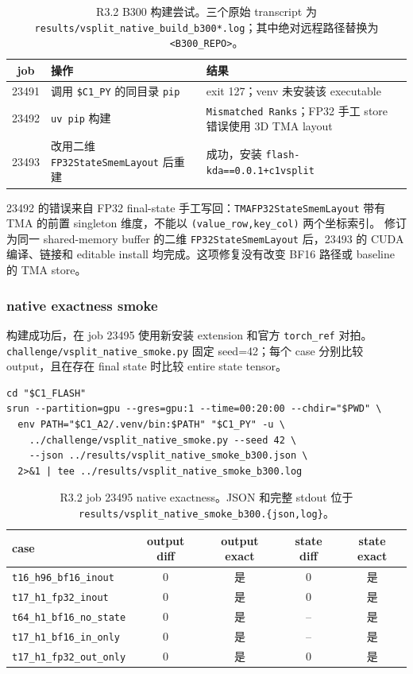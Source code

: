 \documentclass[11pt,a4paper,fontset=none]{ctexart}
\newcommand{\code}[1]{\texttt{#1}}
\begin{document}
\begin{table}[htbp]
\centering
\small
\begin{tabular}{c l l}
\toprule
job & 操作 & 结果 \\
\midrule
23491 & 调用 \code{\$C1\_PY} 的同目录 \code{pip} & exit 127；venv 未安装该 executable \\
23492 & \code{uv pip} 构建 & \code{Mismatched Ranks}；FP32 手工 store 错误使用 3D TMA layout \\
23493 & 改用二维 \code{FP32StateSmemLayout} 后重建 & 成功，安装 \code{flash-kda==0.0.1+c1vsplit} \\
\bottomrule
\end{tabular}
\caption{R3.2 B300 构建尝试。三个原始 transcript 为
\code{results/vsplit\_native\_build\_b300*.log}；其中绝对远程路径替换为
\code{<B300\_REPO>}。}
\end{table}

23492 的错误来自 FP32 final-state 手工写回：\code{TMAFP32StateSmemLayout} 带有
TMA 的前置 singleton 维度，不能以 \code{(value\_row,key\_col)} 两个坐标索引。
修订为同一 shared-memory buffer 的二维 \code{FP32StateSmemLayout} 后，23493
的 CUDA 编译、链接和 editable install 均完成。这项修复没有改变 BF16 路径或
baseline 的 TMA store。

\subsubsection{native exactness smoke}

构建成功后，在 job 23495 使用新安装 extension 和官方 \code{torch\_ref} 对拍。
\code{challenge/vsplit\_native\_smoke.py} 固定 seed=42；每个 case 分别比较
output，且在存在 final state 时比较 entire state tensor。

\begin{lstlisting}
cd "$C1_FLASH"
srun --partition=gpu --gres=gpu:1 --time=00:20:00 --chdir="$PWD" \
  env PATH="$C1_A2/.venv/bin:$PATH" "$C1_PY" -u \
    ../challenge/vsplit_native_smoke.py --seed 42 \
    --json ../results/vsplit_native_smoke_b300.json \
  2>&1 | tee ../results/vsplit_native_smoke_b300.log
\end{lstlisting}

\begin{table}[htbp]
\centering
\small
\begin{tabular}{l c c c c}
\toprule
case & output diff & output exact & state diff & state exact \\
\midrule
\code{t16\_h96\_bf16\_inout} & 0 & 是 & 0 & 是 \\
\code{t17\_h1\_fp32\_inout} & 0 & 是 & 0 & 是 \\
\code{t64\_h1\_bf16\_no\_state} & 0 & 是 & -- & 是 \\
\code{t17\_h1\_bf16\_in\_only} & 0 & 是 & -- & 是 \\
\code{t17\_h1\_fp32\_out\_only} & 0 & 是 & 0 & 是 \\
\bottomrule
\end{tabular}
\caption{R3.2 job 23495 native exactness。JSON 和完整 stdout 位于
\code{results/vsplit\_native\_smoke\_b300.\{json,log\}}。}
\end{table}
\end{document}
